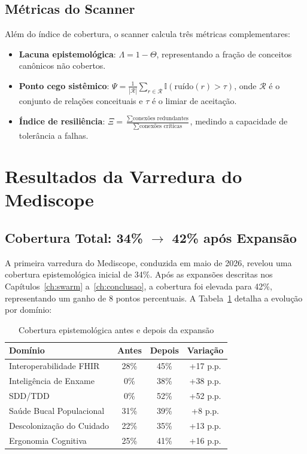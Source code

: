\subsection{Métricas do Scanner}

Além do índice de cobertura, o scanner calcula três métricas complementares:

\begin{itemize}
    \item \textbf{Lacuna epistemológica}: $\Lambda = 1 - \Theta$, representando a fração de conceitos canônicos não cobertos.
    \item \textbf{Ponto cego sistêmico}: $\Psi = \frac{1}{|\mathcal{R}|} \sum_{r \in \mathcal{R}} \mathbb{I}(\text{ruído}(r) > \tau)$, onde $\mathcal{R}$ é o conjunto de relações conceituais e $\tau$ é o limiar de aceitação.
    \item \textbf{Índice de resiliência}: $\Xi = \frac{\sum \text{conexões redundantes}}{\sum \text{conexões críticas}}$, medindo a capacidade de tolerância a falhas.
\end{itemize}

\section{Resultados da Varredura do Mediscope}

\subsection{Cobertura Total: 34\% $\rightarrow$ 42\% após Expansão}

A primeira varredura do Mediscope, conduzida em maio de 2026, revelou uma cobertura epistemológica inicial de 34\%. Após as expansões descritas nos Capítulos~\ref{ch:swarm} a~\ref{ch:conclusao}, a cobertura foi elevada para 42\%, representando um ganho de 8 pontos percentuais. A Tabela~\ref{tab:scanner_coverage} detalha a evolução por domínio:

\begin{table}[htb]
\centering
\caption{Cobertura epistemológica antes e depois da expansão}
\label{tab:scanner_coverage}
\small
\begin{tabular}{lccc}
\toprule
\textbf{Domínio} & \textbf{Antes} & \textbf{Depois} & \textbf{Variação} \\
\midrule
Interoperabilidade FHIR & 28\% & 45\% & +17 p.p. \\
Inteligência de Enxame & 0\% & 38\% & +38 p.p. \\
SDD/TDD & 0\% & 52\% & +52 p.p. \\
Saúde Bucal Populacional & 31\% & 39\% & +8 p.p. \\
Descolonização do Cuidado & 22\% & 35\% & +13 p.p. \\
Ergonomia Cognitiva & 25\% & 41\% & +16 p.p. \\
\bottomrule
\end{tabular}
\end{table}

